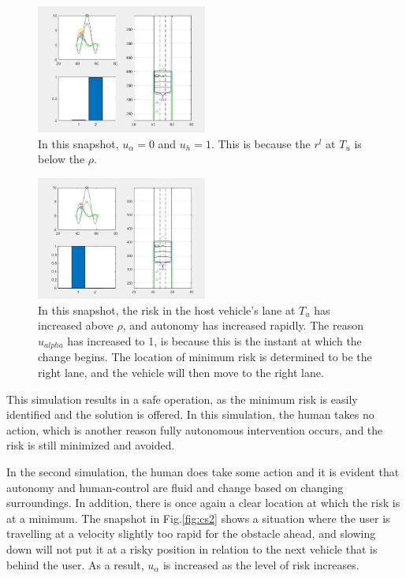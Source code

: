 \documentclass[letterpaper, 10 pt, conference]{ieeeconf}  %
\begin{document}
\begin{figure}[ht]
    \includegraphics[width=0.5\textwidth]{cs1.JPG}
    \caption{In this snapshot, $u_{\alpha} = 0$ and $u_{h} = 1$. This is because the $r^l$ at $T_u$ is below the $\rho$.}
    \label{fig:cs1}
\end{figure}

\begin{figure}[ht]
    \includegraphics[width=0.5\textwidth]{cs1b.JPG}
    \caption{In this snapshot, the risk in the host vehicle's lane at $T_u$ has increased above $\rho$, and autonomy has increased rapidly. The reason $u_{alpha}$ has increased to 1, is because this is the instant at which the change begins. The location of minimum risk is determined to be the right lane, and the vehicle will then move to the right lane.}
    \label{fig:cs1b}
\end{figure}

This simulation results in a safe operation, as the minimum risk is easily identified and the solution is offered. In this simulation, the human takes no action, which is another reason fully autonomous intervention occurs, and the risk is still minimized and avoided.


In the second simulation, the human does take some action and it is evident that autonomy and human-control are fluid and change based on changing surroundings. In addition, there is once again a clear location at which the risk is at a minimum. The snapshot in Fig.\ref{fig:cs2} shows a situation where the user is travelling at a velocity slightly too rapid for the obstacle ahead, and slowing down will not put it at a risky position in relation to the next vehicle that is behind the user. As a result, $u_{\alpha}$ is increased as the level of risk increases.
\end{document}
